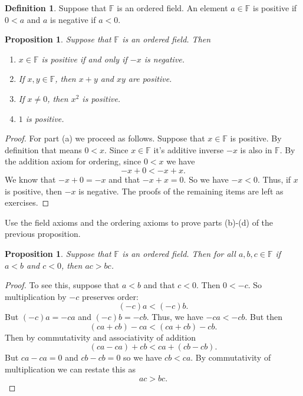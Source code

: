 \documentclass[11pt]{article}
\newenvironment{task}
	{\begin{mdframed}[linecolor=lightgray, linewidth=3pt]\raggedright}
	{\end{mdframed}}
\newtheorem{proposition}[theorem]{Proposition}
\theoremstyle{definition}
\newtheorem{definition}[theorem]{Definition}
\begin{document}
\begin{definition}
  Suppose that $\mathbb{F}$ is an ordered field. An element $a\in\mathbb{F}$ is positive if $0 < a$ and $a$ is negative if $a < 0$.
\end{definition}

\begin{proposition}
  Suppose that $\mathbb{F}$ is an ordered field. Then
  \begin{enumerate}
    \item[(a)] $x\in \mathbb{F}$ is positive if and only if $-x$ is negative.
    \item[(b)] If $x,y \in \mathbb{F}$, then $x+y$ and $xy$ are positive.
    \item[(c)] If $x\neq 0$, then $x^2$ is positive.
    \item[(d)] $1$ is positive.
  \end{enumerate}
\end{proposition}
\begin{proof}
  For part (a) we proceed as follows. Suppose that $x\in\mathbb{F}$ is positive. By definition that means $0 < x$. Since $x\in\mathbb{F}$ it's additive
  inverse $-x$ is also in $\mathbb{F}$. By the addition axiom for ordering, since $0 < x$ we have
  \[ -x + 0 < -x + x.\]
  We know that $-x+0 = -x$ and that $-x + x = 0$. So we have $-x < 0$. Thus, if $x$ is positive, then $-x$ is negative. The proofs of the remaining items
  are left as exercises.
\end{proof}

\begin{task}
  Use the field axioms and the ordering axioms to prove parts (b)-(d) of the previous proposition.
\end{task}

\begin{proposition}
  Suppose that $\mathbb{F}$ is an ordered field. Then for all $a,b,c\in\mathbb{F}$ if $a< b$ and $c < 0$, then $ac > bc$.
\end{proposition}
\begin{proof}
  To see this, suppose that $a < b$ and that $c < 0$. Then $0 < -c$. So multiplication by $-c$ preserves order:
  \[ (-c)a < (-c)b.\]
  But $(-c)a = -ca$ and $(-c)b = -cb$. Thus, we have $-ca < -cb$. But then
  \[ (ca + cb) - ca < (ca + cb) -cb.\]
  Then by commutativity and associativity of addition
  \[ (ca - ca) + cb < ca + (cb -cb).\]
  But $ca - ca = 0$ and $cb - cb =0$ so we have $cb < ca$. By commutativity of multiplication we can restate this as
  \[ ac > bc. \]
\end{proof}
\end{document}
